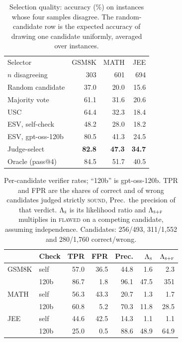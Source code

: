 \documentclass[letterpaper]{article} %
\newcommand{\method}{\textsc{ESV}}   %
\begin{document}
\begin{table}[!ht]
\centering
\small
\setlength{\tabcolsep}{4pt}
\begin{tabular}{@{}lrrr@{}}
\toprule
Selector & GSM8K & MATH & JEE \\
$n$ disagreeing & 303 & 601 & 694 \\
\midrule
Random candidate & 37.0 & 20.0 & 15.6 \\
Majority vote & 61.1 & 31.6 & 20.6 \\
USC & 64.4 & 32.3 & 18.4 \\
\method{}, self-check & 48.2 & 28.0 & 18.2 \\
\method{}, gpt-oss-120b & 80.5 & 41.3 & 24.5 \\
Judge-select & \textbf{82.8} & \textbf{47.3} & \textbf{34.7} \\
Oracle (pass@4) & 84.5 & 51.7 & 40.5 \\
\bottomrule
\end{tabular}
\caption{Selection quality: accuracy (\%) on instances whose four samples disagree. The random-candidate row is the expected accuracy of drawing one candidate uniformly, averaged over instances.}
\label{tab:selection}
\end{table}

\begin{table}[!ht]
\centering
\small
\setlength{\tabcolsep}{3pt}
\begin{tabular}{@{}llrrrrr@{}}
\toprule
 & Check & TPR & FPR & Prec. & $\Lambda_{\textsc{s}}$ & $\Lambda_{\textsc{s}+\textsc{f}}$ \\
\midrule
GSM8K & self & 57.0 & 36.5 & 44.8 & 1.6 & 2.3 \\
      & 120b & 86.7 & 1.8 & 96.1 & 47.5 & 351 \\
MATH  & self & 56.3 & 43.3 & 20.7 & 1.3 & 1.7 \\
      & 120b & 60.8 & 5.2 & 70.3 & 11.8 & 28.5 \\
JEE   & self & 44.6 & 42.5 & 14.3 & 1.1 & 1.1 \\
      & 120b & 25.0 & 0.5 & 88.6 & 48.9 & 64.9 \\
\bottomrule
\end{tabular}
\caption{Per-candidate verifier rates; ``120b'' is gpt-oss-120b. TPR and FPR
are the shares of correct and of wrong candidates judged strictly
\textsc{sound}, Prec.\ the precision of that verdict.
$\Lambda_{\textsc{s}}$ is its likelihood ratio and
$\Lambda_{\textsc{s}+\textsc{f}}$ multiplies in \textsc{flawed} on a competing
candidate, assuming independence. Candidates: 256/493, 311/1{,}552 and
280/1{,}760 correct/wrong.}
\label{tab:detector}
\end{table}
\end{document}
